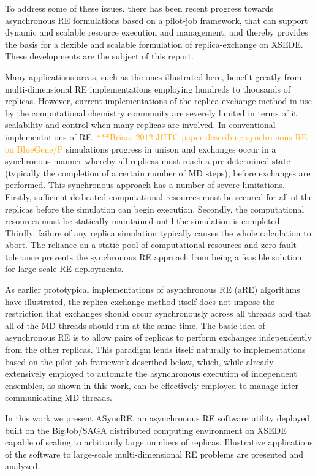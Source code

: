 \documentclass{sig-alternate}
\newcommand{\brnote}[1]{ {\textcolor{Orange} { ***Brian: #1 }}}
\newcommand{\brnote}[1]{ {}}
\begin{document}
To address some of these issues, there has been recent progress
towards  asynchronous RE formulations based on a pilot-job framework, that can support
dynamic and scalable resource execution and management, and thereby
provides the basis for a flexible and scalable formulation of
replica-exchange on XSEDE. These developments are the subject of this report.


Many applications areas, such as the ones illustrated here,
benefit greatly from multi-dimensional RE implementations employing
hundreds to thousands of replicas. However, current implementations
of the replica exchange method in use by the computational chemistry
community are severely limited in terms of it scalability and control
when many replicas are involved. In conventional implementations of
RE\cite{Jiang_JChemTheoryComput_2012_v8_p4672},\brnote{2012 JCTC paper describing synchronous RE on BlueGene/P} 
simulations progress in unison and exchanges occur in a
synchronous manner whereby all replicas must reach a pre-determined
state (typically the completion of a certain number of MD steps),
before exchanges are performed. This synchronous approach has a number
of severe limitations. Firstly, sufficient dedicated computational
resources must be secured for all of the replicas before the
simulation can begin execution. Secondly, the computational resources
must be statically maintained until the simulation is
completed. Thirdly, failure of any replica simulation typically causes
the whole calculation to abort. The reliance on a static pool of
computational resources and zero fault tolerance prevents the
synchronous RE approach from being a feasible solution for large scale
RE deployments.

As earlier prototypical implementations of asynchronous RE (aRE)
algorithms\cite{Gallicchio2008} have illustrated, the replica
exchange method itself does not impose the restriction that exchanges
should occur synchronously across all threads and that all of the MD
threads should run at the same time. The basic idea of asynchronous
RE is to allow pairs of replicas to perform exchanges independently
from the other replicas. This paradigm lends itself naturally to
implementations based on the pilot-job framework described below,
which, while already extensively employed to automate the asynchronous
execution of independent ensembles, as shown in this work, can be
effectively employed to manage inter-communicating MD threads.

In this work we present ASyncRE, an asynchronous RE software utility
deployed built on the BigJob/SAGA distributed computing environment on
XSEDE capable of scaling to arbitrarily large numbers of
replicas. Illustrative applications of the software to large-scale
multi-dimensional RE problems are presented and analyzed.
\end{document}
